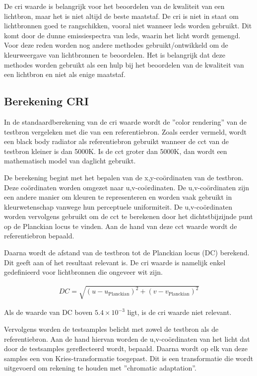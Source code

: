 De \gls{cri} waarde is belangrijk voor het beoordelen van de kwaliteit van een lichtbron, maar het is niet altijd de beste maatstaf. De \gls{cri} is niet in staat om lichtbronnen goed te rangschikken, vooral niet wanneer \gls{led}s worden gebruikt. Dit komt door de dunne emissiespectra van \gls{led}s, waarin het licht wordt gemengd. Voor deze reden worden nog andere methodes gebruikt/ontwikkeld om de kleurweergave van lichtbronnen te beoordelen. Het is belangrijk dat deze methodes worden gebruikt als een hulp bij het beoordelen van de kwaliteit van een lichtbron en niet als enige maatstaf.

\subsection{Berekening CRI\texorpdfstring{~\cite{rootPrincipleBasicCalculation,ColorRenderingIndexWiki}}{}}

In de standaardberekening van de \gls{cri} waarde wordt de ''color rendering'' van de testbron vergeleken met die van een referentiebron. Zoals eerder vermeld, wordt een black body radiator als referentiebron gebruikt wanneer de \gls{cct} van de testbron kleiner is dan 5000K. Is de \gls{cct} groter dan 5000K, dan wordt een mathematisch model van daglicht gebruikt.

De berekening begint met het bepalen van de x,y-co\"ordinaten van de testbron. Deze co\"ordinaten worden omgezet naar u,v-co\"ordinaten. De u,v-co\"ordinaten zijn een andere manier om kleuren te representeren en worden vaak gebruikt in kleurwetenschap vanwege hun perceptuele uniformiteit. De u,v-co\"ordinaten worden vervolgens gebruikt om de \gls{cct} te berekenen door het dichtstbijzijnde punt op de Planckian locus te vinden. Aan de hand van deze \gls{cct} waarde wordt de referentiebron bepaald.

Daarna wordt de afstand van de testbron tot de Planckian locus (DC) berekend. Dit geeft aan of het resultaat relevant is. De \gls{cri} waarde is namelijk enkel gedefinieerd voor lichtbronnen die ongeveer wit zijn.

\begin{align*}
    DC = \sqrt{(u - u_{\text{Planckian}})^2 + (v - v_{\text{Planckian}})^2}
\end{align*}

Als de waarde van DC boven $5.4 \times 10^{-3}$ ligt, is de \gls{cri} waarde niet relevant.

Vervolgens worden de testsamples belicht met zowel de testbron als de referentiebron. Aan de hand hiervan worden de u,v-co\"ordinaten van het licht dat door de testsamples gereflecteerd wordt, bepaald. Daarna wordt op elk van deze samples een von Kries-transformatie toegepast. Dit is een transformatie die wordt uitgevoerd om rekening te houden met ''chromatic adaptation''.

